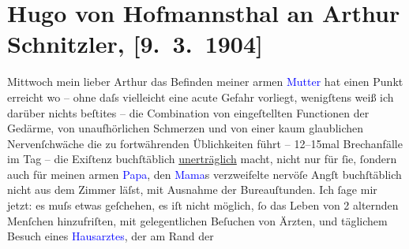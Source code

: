 

               \section[Hugo von Hofmannsthal an Arthur Schnitzler, {[}9. 3. 1904{]}]{ Hugo von Hofmannsthal an Arthur Schnitzler, {[}9. 3. 1904{]}}\nopagebreak{}\rehead{ }\normalsize\beginnumbering{} \toendnotes[C]{\smallbreak\pagebreak[2]} 
\toendnotes[C]{\smallbreak}\pstart
           \raggedleft{}{\pb}Mittwoch\pend
           \pstart{}mein lieber Arthur\pend\pstart
           das Befinden meiner armen \textcolor{blue}{Mutter}{} hat einen Punkt erreicht wo – ohne daſs vielleicht eine acute Gefahr
               vorliegt, wenigſtens weiß ich darüber nichts beſti{\geminationm}tes –
               die Combination von eingeſtellten Functionen der Gedärme, von unaufhörlichen
               Schmerzen und von einer kaum glaublichen Nerven{\pb}ſchwäche die zu fortwährenden
               Üblichkeiten führt – 12–15mal Brechanfälle im Tag – die Exiſtenz buchſtäblich \uline{unerträglich} macht, nicht nur für ſie, ſondern auch
               für meinen armen \textcolor{blue}{Papa}{}, den \textcolor{blue}{Mama}{}s verzweifelte nervöſe Angſt
               buchſtäblich nicht aus dem Zimmer läſst, mit Ausnahme der Bureauſtunden.\pend
           \pstart
           Ich ſage mir jetzt: es muſs {\pb}etwas
               geſchehen, es iſt nicht möglich, ſo das Leben von 2 alternden Menſchen hinzufriſten,
               mit gelegentlichen Beſuchen von Ärzten, und täglichem Besuch eines \textcolor{blue}{Hausarztes}{}, der am Rand der

